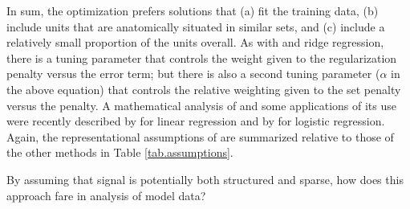 

In sum, the optimization prefers solutions that (a) fit the training data, (b) include units that are anatomically situated in similar sets, and (c) include a relatively small proportion of the units overall.  As with {\lasso} and ridge regression, there is a tuning parameter that controls the weight given to the regularization penalty versus the error term; but there is also a second tuning parameter ($\alpha$ in the above equation) that controls the relative weighting given to the set penalty versus the {\lasso} penalty.  A mathematical analysis of {\soslasso} and some applications of its use were recently described by  for linear regression and by  for logistic regression. Again, the representational assumptions of {\soslasso} are summarized relative to those of the other methods in Table \ref{tab.assumptions}.

By assuming that signal is potentially both structured and sparse, how does this approach fare in analysis of model data?

